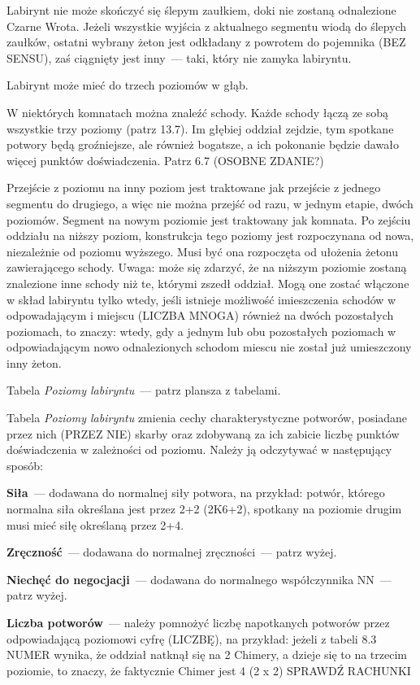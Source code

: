Labirynt nie może skończyć się ślepym zaułkiem, doki nie zostaną odnalezione Czarne Wrota.
Jeżeli wszystkie wyjścia z aktualnego segmentu wiodą do ślepych zaułków, ostatni wybrany żeton jest odkładany z powrotem do pojemnika (BEZ SENSU), zaś ciągnięty jest inny~--- taki, który nie zamyka labiryntu.

Labirynt może mieć do trzech poziomów w głąb.

W niektórych komnatach można znaleźć schody.
Każde schody łączą ze sobą wszystkie trzy poziomy (patrz 13.7).
Im głębiej oddział zejdzie, tym spotkane potwory będą groźniejsze, ale również bogatsze, a ich pokonanie będzie dawało więcej punktów doświadczenia.
Patrz 6.7 (OSOBNE ZDANIE?)

Przejście z poziomu na inny poziom jest traktowane jak przejście z jednego segmentu do drugiego, a więc nie można przejść od razu, w jednym etapie, dwóch poziomów.
Segment na nowym poziomie jest traktowany jak komnata.
Po zejściu oddziału na niższy poziom, konstrukcja tego poziomy jest rozpoczynana od nowa, niezależnie od poziomu wyższego.
Musi być ona rozpoczęta od ułożenia żetonu zawierającego schody.
Uwaga: może się zdarzyć, że na niższym poziomie zostaną znalezione inne schody niż te, którymi zszedł oddział.
Mogą one zostać włączone w skład labiryntu tylko wtedy, jeśli istnieje możliwość imieszczenia schodów w odpowadającym i miejscu (LICZBA MNOGA) również na dwóch pozostałych poziomach, to znaczy: wtedy, gdy a jednym lub obu pozostałych poziomach w odpowiadającym nowo odnalezionych schodom miescu nie został już umieszczony inny żeton.

Tabela \textit{Poziomy labiryntu}~--- patrz plansza z tabelami.

Tabela \textit{Poziomy labiryntu} zmienia cechy charakterystyczne potworów, posiadane przez nich (PRZEZ NIE) skarby oraz zdobywaną za ich zabicie liczbę punktów doświadczenia w zależności od poziomu.
Należy ją odczytywać w następujący sposób:

\textbf{Siła}~--- dodawana do normalnej siły potwora, na przykład: potwór, którego normalna siła określana jest przez 2+2 (2K6+2), spotkany na poziomie drugim musi mieć siłę określaną przez 2+4.

\textbf{Zręczność}~--- dodawana do normalnej zręczności~--- patrz wyżej.

\textbf{Niechęć do negocjacji}~--- dodawana do normalnego współczynnika NN~--- patrz wyżej.

\textbf{Liczba potworów}~--- należy pomnożyć liczbę napotkanych potworów przez odpowiadającą poziomowi cyfrę (LICZBĘ), na przykład: jeżeli z tabeli 8.3 NUMER wynika, że oddział natknął się na 2 Chimery, a dzieje się to na trzecim poziomie, to znaczy, że faktycznie Chimer jest 4 (2 x 2) SPRAWDŹ RACHUNKI

